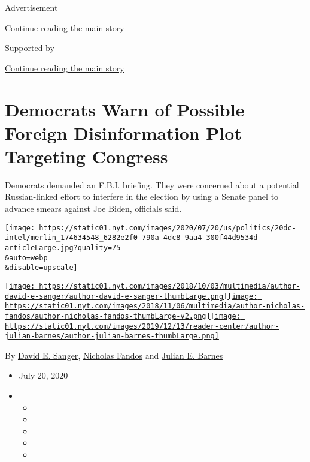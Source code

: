 Advertisement

\protect\hyperlink{after-top}{Continue reading the main story}

Supported by

\protect\hyperlink{after-sponsor}{Continue reading the main story}

\hypertarget{democrats-warn-of-possible-foreign-disinformation-plot-targeting-congress}{%
\section{Democrats Warn of Possible Foreign Disinformation Plot
Targeting
Congress}\label{democrats-warn-of-possible-foreign-disinformation-plot-targeting-congress}}

Democrats demanded an F.B.I. briefing. They were concerned about a
potential Russian-linked effort to interfere in the election by using a
Senate panel to advance smears against Joe Biden, officials said.

\texttt{[image: https://static01.nyt.com/images/2020/07/20/us/politics/20dc-intel/merlin\_174634548\_6282e2f0-790a-4dc8-9aa4-300f44d9534d-articleLarge.jpg?quality=75\\\&auto=webp\\\&disable=upscale]}

\href{https://www.nytimes.com/by/david-e-sanger}{\texttt{[image: https://static01.nyt.com/images/2018/10/03/multimedia/author-david-e-sanger/author-david-e-sanger-thumbLarge.png]}}\href{https://www.nytimes.com/by/nicholas-fandos}{\texttt{[image: https://static01.nyt.com/images/2018/11/06/multimedia/author-nicholas-fandos/author-nicholas-fandos-thumbLarge-v2.png]}}\href{https://www.nytimes.com/by/julian-e-barnes}{\texttt{[image: https://static01.nyt.com/images/2019/12/13/reader-center/author-julian-barnes/author-julian-barnes-thumbLarge.png]}}

By \href{https://www.nytimes.com/by/david-e-sanger}{David E. Sanger},
\href{https://www.nytimes.com/by/nicholas-fandos}{Nicholas Fandos} and
\href{https://www.nytimes.com/by/julian-e-barnes}{Julian E. Barnes}

\begin{itemize}
\item
  July 20, 2020
\item
  \begin{itemize}
  \item
  \item
  \item
  \item
  \item
  \end{itemize}
\end{itemize}

